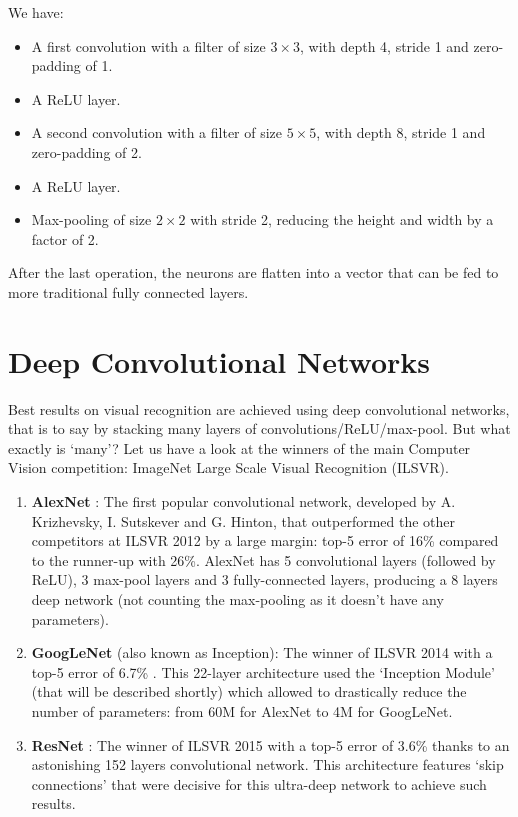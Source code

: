 We have:
\begin{itemize}
    \item A first convolution with a filter of size $3\times3$, with depth 4, stride 1 and zero-padding of 1.
    \item A ReLU layer.
    \item A second convolution with a filter of size $5\times5$, with depth 8, stride 1 and zero-padding of 2.
    \item A ReLU layer.
    \item Max-pooling of size $2\times2$ with stride 2, reducing the height and width by a factor of 2.
\end{itemize}

After the last operation, the neurons are flatten into a vector that can be fed to more traditional fully connected layers.

\section{Deep Convolutional Networks}
Best results on visual recognition are achieved using deep convolutional networks, that is to say by stacking many layers of convolutions/ReLU/max-pool. But what exactly is `many'? Let us have a look at the winners of the main Computer Vision competition: ImageNet Large Scale Visual Recognition (ILSVR).
\begin{enumerate}
    \item \textbf{AlexNet} \cite{alexnet}: The first popular convolutional network, developed by A. Krizhevsky, I. Sutskever and G. Hinton, that outperformed 
    the other competitors at ILSVR 2012 by a large margin: top-5 error of 16\% compared to the runner-up with 26\%. AlexNet has 5 convolutional layers (followed by 
    ReLU), 3 max-pool layers and 3 fully-connected layers, producing a 8 layers deep network (not counting the max-pooling as it doesn't have any parameters).
    \item \textbf{GoogLeNet} (also known as Inception)\cite{googlenet}: The winner of ILSVR 2014 with a top-5 error of 6.7\% . This 22-layer architecture used 
    the `Inception Module' (that will be described shortly) which allowed to drastically reduce the number of parameters: from 60M for AlexNet to 4M for GoogLeNet.
    \item \textbf{ResNet} \cite{resnet}: The winner of ILSVR 2015 with a top-5 error of 3.6\% thanks to an astonishing 152 layers convolutional network. This 
    architecture features `skip connections' that were decisive for this ultra-deep network to achieve such results.
\end{enumerate}

